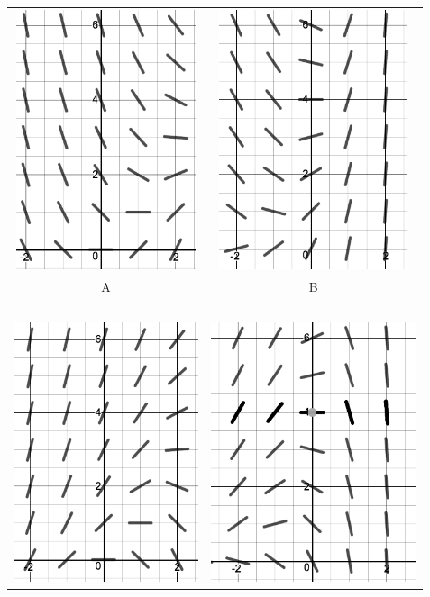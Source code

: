 \documentclass[addpoints,12pt]{exam}
\begin{document}
\begin{questions}
\begin{parts}
\begin{tabular}{c|c} \includegraphics[height=3in]{sf4} & 
 \includegraphics[height=3in]{sf2}\\
 A & B \\
 \hline
 ~\\
 \includegraphics[height=3in]{sf3}&
 \includegraphics[height=3in]{sf1}\\

\end{tabular}
\end{parts}
\end{questions}
\end{document}
